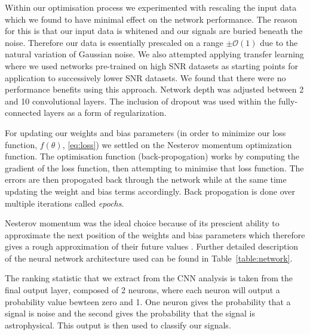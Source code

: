 \documentclass[%
 amsmath,amssymb,
 aps,
 twocolumn,
 prl,
 reprint,
floatfix,
]{revtex4-1}
\begin{document}
%
%
Within our optimisation process we experimented with rescaling the input data
which we found to have minimal effect on the network performance. The reason
for this is that our input data is whitened and our signals are buried beneath
the noise. Therefore our data is essentially prescaled on a range
$\pm\mathcal{O}(1)$ due to the natural variation of Gaussian noise. We also
attempted applying transfer learning \cite{5288526}
where we used networks pre-trained on high \ac{SNR} datasets as starting points
for application to successively lower \ac{SNR} datasets. We found that there
were no performance benefits using this approach.  Network depth was adjusted
between 2 and 10 convolutional layers. The
inclusion of dropout was used within the fully-connected layers as a form of
regularization.

%
%
For updating our weights and bias parameters (in
order to minimize our loss function, $f(\theta)$, \eqref{eq:loss}) we settled
on the Nesterov momentum optimization function. The optimisation function (back-propogation) works by
computing the gradient of the loss function, then attempting to minimise 
that loss function. The errors are then propogated back through the network while at the same time 
updating the weight and bias terms accordingly.  Back propogation is done over multiple iterations called \textit{epochs}. 



Nesterov momentum was the ideal choice because of its prescient ability to
approximate the next position of the weights and bias parameters which
therefore gives a rough approximation of their future values
\cite{Sutskever:2013:IIM:3042817.3043064}. Further detailed description of the
neural network architecture used can be found in
Table~\ref{table:network}. 

The ranking statistic that we extract from the CNN analysis is taken from the final output layer,
composed of 2 neurons, where each neuron will output a probability value bewteen zero and 1. One neuron gives the probability that a signal is noise and the second gives the probability that the signal is astrophysical. This output is then used to classify our signals.
\end{document}
